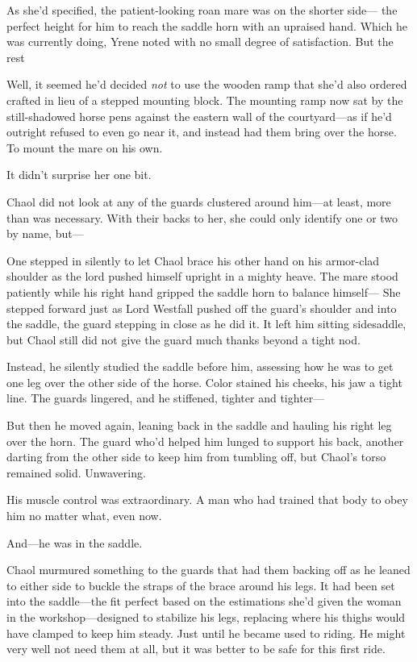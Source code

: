 As she'd specified, the patient-looking roan mare was on the shorter side--- the perfect height for him to reach the saddle horn with an upraised hand. Which he was currently doing, Yrene noted with no small degree of satisfaction. But the rest 

Well, it seemed he'd decided \emph{not} to use the wooden ramp that she'd also ordered crafted in lieu of a stepped mounting block. The mounting ramp now sat by the still-shadowed horse pens against the eastern wall of the courtyard---as if he'd outright refused to even go near it, and instead had them bring over the horse. To mount the mare on his own.

It didn't surprise her one bit.

Chaol did not look at any of the guards clustered around him---at least, more than was necessary. With their backs to her, she could only identify one or two by name, but---

One stepped in silently to let Chaol brace his other hand on his armor-clad shoulder as the lord pushed himself upright in a mighty heave. The mare stood patiently while his right hand gripped the saddle horn to balance himself--- She stepped forward just as Lord Westfall pushed off the guard's shoulder and into the saddle, the guard stepping in close as he did it. It left him sitting sidesaddle, but Chaol still did not give the guard much thanks beyond a tight nod.

Instead, he silently studied the saddle before him, assessing how he was to get one leg over the other side of the horse. Color stained his cheeks, his jaw a tight line. The guards lingered, and he stiffened, tighter and tighter---

But then he moved again, leaning back in the saddle and hauling his right leg over the horn. The guard who'd helped him lunged to support his back, another darting from the other side to keep him from tumbling off, but Chaol's torso remained solid. Unwavering.

His muscle control was extraordinary. A man who had trained that body to obey him no matter what, even now.

And---he was in the saddle.

Chaol murmured something to the guards that had them backing off as he leaned to either side to buckle the straps of the brace around his legs. It had been set into the saddle---the fit perfect based on the estimations she'd given the woman in the workshop---designed to stabilize his legs, replacing where his thighs would have clamped to keep him steady. Just until he became used to riding. He might very well not need them at all, but  it was better to be safe for this first ride.

